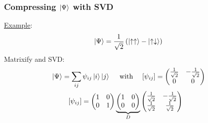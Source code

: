 \documentclass{beamer}
\theoremstyle{definition}
\newcommand{\lp}{\left(}
\newcommand{\rp}{\right)}
\newcommand{\f}[2]{\frac{#1}{#2}}
\begin{document}
\begin{frame}
	\frametitle{Compressing $\ket{\Psi}$ with SVD}
	
	\underline{Example}:  
	\begin{align*}
		\ket{\Psi} = \f{1}{\sqrt{2}}\lp \ket{\uparrow\uparrow} - \ket{\uparrow\downarrow} \rp
	\end{align*}
	Matrixify and SVD:
	\begin{align*}
	&\ket{\Psi} = \sum_{ij}\psi_{ij}\ket{i}\ket{j} \quad \text{ with } \quad   [\psi_{ij}] = \begin{pmatrix}
			\f{1}{\sqrt{2}} & -\f{1}{\sqrt{2}} \\ 0 & 0
		\end{pmatrix}\\
	&\quad\quad \,\,\,[\psi_{ij}] = \begin{pmatrix}
			1 & 0 \\ 0 & 1
		\end{pmatrix}
	\underbrace{\begin{pmatrix}
		1 & 0 \\ 0 & 0 
	\end{pmatrix}}_D
	\begin{pmatrix}
		\f{1}{\sqrt{2}} & -\f{1}{\sqrt{2}} \\ 	\f{1}{\sqrt{2}} & \f{1}{\sqrt{2}}
	\end{pmatrix}
	\end{align*}

\end{frame}
\end{document}
